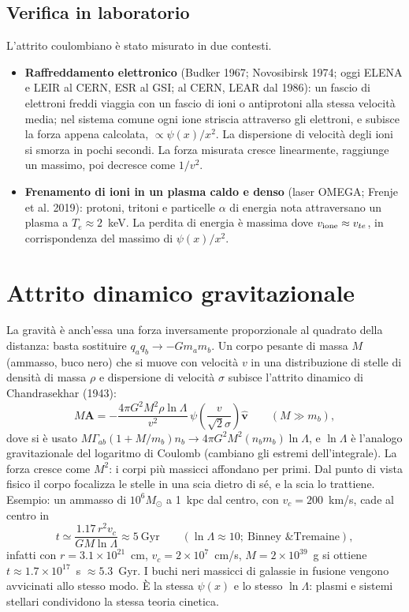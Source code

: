 \subsection{Verifica in laboratorio}
L'attrito coulombiano è stato misurato in due contesti.
\begin{itemize}
\item \textbf{Raffreddamento elettronico} (Budker 1967; Novosibirsk 1974; oggi ELENA e LEIR al CERN, ESR al GSI; al CERN, LEAR dal 1986): un fascio di elettroni freddi viaggia con un fascio di ioni o antiprotoni alla stessa velocità media; nel sistema comune ogni ione striscia attraverso gli elettroni, e subisce la forza appena calcolata, $\propto\psi(x)/x^2$. La dispersione di velocità degli ioni si smorza in pochi secondi. La forza misurata cresce linearmente, raggiunge un massimo, poi decresce come $1/v^2$.
\item \textbf{Frenamento di ioni in un plasma caldo e denso} (laser OMEGA; Frenje et al. 2019): protoni, tritoni e particelle $\alpha$ di energia nota attraversano un plasma a $T_e\approx2$~keV. La perdita di energia è massima dove $v_{\rm ione}\approx v_{te}$, in corrispondenza del massimo di $\psi(x)/x^2$.
\end{itemize}

\section{Attrito dinamico gravitazionale}
La gravità è anch'essa una forza inversamente proporzionale al quadrato della distanza: basta sostituire $q_aq_b\to-Gm_am_b$. Un corpo pesante di massa $M$ (ammasso, buco nero) che si muove con velocità $v$ in una distribuzione di stelle di densità di massa $\rho$ e dispersione di velocità $\sigma$ subisce l'attrito dinamico di Chandrasekhar (1943):
\begin{equation}
M\mathbf{A}=-\frac{4\pi G^2M^2\rho\ln\Lambda}{v^2}\,\psi\left(\frac{v}{\sqrt2\sigma}\right)\hat{\mathbf{v}}\qquad(M\gg m_b),
\end{equation}
dove si è usato $M\Gamma_{ab}(1+M/m_b)n_b\to4\pi G^2M^2(n_bm_b)\ln\Lambda$, e $\ln\Lambda$ è l'analogo gravitazionale del logaritmo di Coulomb (cambiano gli estremi dell'integrale). La forza cresce come $M^2$: i corpi più massicci affondano per primi. Dal punto di vista fisico il corpo focalizza le stelle in una scia dietro di sé, e la scia lo trattiene.
Esempio: un ammasso di $10^6M_\odot$ a 1~kpc dal centro, con $v_c=200$~km/s, cade al centro in
\begin{equation}
t\simeq\frac{1.17\,r^2v_c}{GM\ln\Lambda}\approx5~\mathrm{Gyr}\qquad(\ln\Lambda\approx10;\ \text{Binney \& Tremaine}),
\end{equation}
infatti con $r=3.1\times10^{21}$~cm, $v_c=2\times10^7$~cm/s, $M=2\times10^{39}$~g si ottiene $t\approx1.7\times10^{17}$~s $\approx5.3$~Gyr. I buchi neri massicci di galassie in fusione vengono avvicinati allo stesso modo. È la stessa $\psi(x)$ e lo stesso $\ln\Lambda$: plasmi e sistemi stellari condividono la stessa teoria cinetica.

